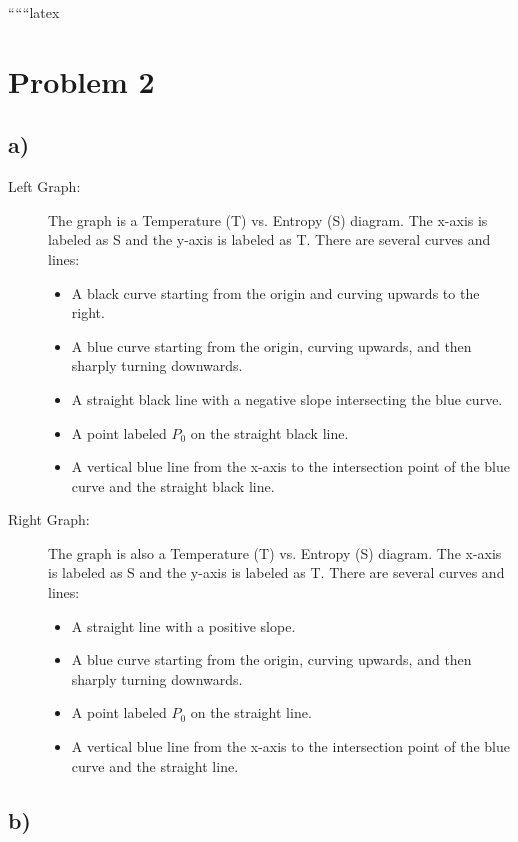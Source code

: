 
``````latex


\section*{Problem 2}

\subsection*{a)}

\begin{description}
    \item[Left Graph:] 
    The graph is a Temperature (T) vs. Entropy (S) diagram. The x-axis is labeled as S and the y-axis is labeled as T. There are several curves and lines:
    \begin{itemize}
        \item A black curve starting from the origin and curving upwards to the right.
        \item A blue curve starting from the origin, curving upwards, and then sharply turning downwards.
        \item A straight black line with a negative slope intersecting the blue curve.
        \item A point labeled $P_0$ on the straight black line.
        \item A vertical blue line from the x-axis to the intersection point of the blue curve and the straight black line.
    \end{itemize}
    
    \item[Right Graph:]
    The graph is also a Temperature (T) vs. Entropy (S) diagram. The x-axis is labeled as S and the y-axis is labeled as T. There are several curves and lines:
    \begin{itemize}
        \item A straight line with a positive slope.
        \item A blue curve starting from the origin, curving upwards, and then sharply turning downwards.
        \item A point labeled $P_0$ on the straight line.
        \item A vertical blue line from the x-axis to the intersection point of the blue curve and the straight line.
    \end{itemize}
\end{description}

\subsection*{b)}

